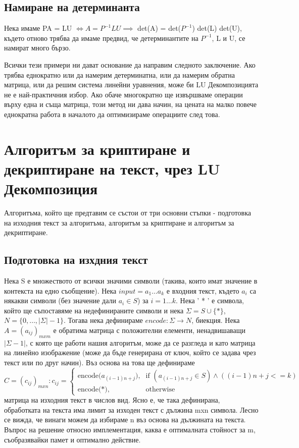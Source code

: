 \documentclass{article}
\begin{document}
\subsection{Намиране на детерминанта}
Нека имаме PA = LU $\Leftrightarrow A = P^{-1}LU \implies$ det(A) = det($P^{-1}$) det(L) det(U), където отново трябва да имаме предвид, че детерминантите на $P^{-1}$, L и U, се намират много бързо.

Всички тези примери ни дават основание да направим следното заключение. Ако трябва еднократно или да намерим детерминатна, или да намерим обратна матрица, или да решим система линейни уравнения, може би LU Декомпозицията не е най-практичния избор. Ако обаче многократно ще извършваме операции върху една и съща матрица, този метод ни дава начин, на цената на малко повече еднократна работа в началото да оптимизираме операциите след това.

\section{Алгоритъм за криптиране и декриптиране на текст, чрез LU Декомпозиция}
Алгоритъма, който ще предтавим се състои от три основни стъпки - подготовка на изходния текст за алгоритъма, алгоритъм за криптиране и алгоритъм за декриптиране.
\subsection{Подготовка на изхдния текст}
Нека S е множеството от всички значими символи (такива, които имат значение в контекста на едно съобщение). Нека $input = a_{1}\dots a_{k}$ е входния текст, където $a_{i}$ са някакви символи (без значение дали $a_{i} \in S$) за $i = 1\dots k$. Нека ' * ' е символа, който ще съпоставяме на недефинираните символи и нека $\Sigma = S\cup \{ * \}$, $N = \{ 0,\dots , |\Sigma| - 1 \}$. Тогава нека дефинираме $encode : \Sigma \to N$, биекция. Нека $A = (a_{ij})_{mxm}$ е обратима матрица с положителни елементи, ненадвишаващи $|\Sigma - 1|$, с която ще работи нашия алгоритъм, може да се разгледа и като матрица на линейно изображение (може да бъде генерирана от ключ, който се задава чрез текст или по друг начин). Въз основа на това ще дефинираме
\[C = (c_{ij})_{mxn} : c_{ij} = \begin{cases} \mbox{encode($a_{(i - 1)n + j}$),} & \mbox{if } (a_{(i - 1)n + j} \in S) \land ((i - 1)n + j <= k) \\ \mbox{encode(*),} & \mbox{otherwise} \end{cases}\]
матрица на изходния текст в числов вид. Ясно е, че така дефинирана, обработката на текста има лимит за изходен текст с дължина mxn символа. Лесно се вижда, че винаги можем да избираме n въз основа на дължината на текста. Въпрос на решение относно имплементация, каква е оптималната стойност за m, съобразявайки памет и оптимално действие.
\end{document}
